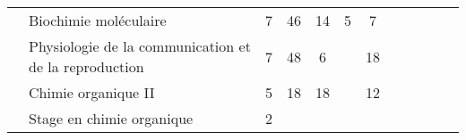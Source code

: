 \begin{tabular}{c|m{4.5cm}|cm{0.75cm}|cm{0.75cm}|cm{0.75cm}|cm{0.75cm}|cm{0.75cm}|}
 & \cellcolor{couleurClaire} \color{couleurTexte} Biochimie moléculaire  & \cellcolor{couleurClaire} \color{couleurTexte} 7 & \cellcolor{couleurClaire} \color{couleurTexte} 46 & \cellcolor{couleurClaire} \color{couleurTexte} 14 & \cellcolor{couleurClaire} \color{couleurTexte} 5 & \cellcolor{couleurClaire} \color{couleurTexte} 7 \\ \cline{2-7}

 & \color{black} Physiologie de la communication et de la reproduction  & \color{black} 7 & \color{black} 48 & \color{black} 6 & \color{black} & \color{black} 18 \\ \cline{2-7}

 & \cellcolor{couleurClaire} \color{couleurTexte} Chimie organique II  & \cellcolor{couleurClaire} \color{couleurTexte} 5 & \cellcolor{couleurClaire} \color{couleurTexte} 18 & \cellcolor{couleurClaire} \color{couleurTexte} 18 & \cellcolor{couleurClaire} \color{couleurTexte} & \cellcolor{couleurClaire} \color{couleurTexte} 12 \\ \cline{2-7}

 & \color{black} Stage en chimie organique & \color{black} 2 & \color{black} & \color{black} & & \color{black} \\ \cline{1-7}


\end{tabular}

